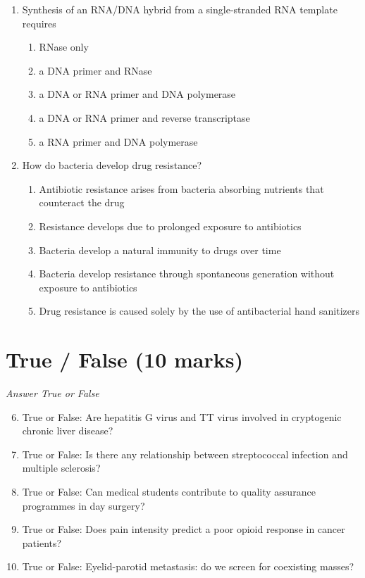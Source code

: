 \documentclass[12pt]{article}
\begin{document}
\begin{enumerate}[label=\arabic*.]
\begin{enumerate}[label=(\alph*)]
\end{enumerate}
\item Synthesis of an RNA/DNA hybrid from a single-stranded RNA template requires
\begin{enumerate}[label=(\alph*)]
    \item RNase only
    \item a DNA primer and RNase
    \item a DNA or RNA primer and DNA polymerase
    \item a DNA or RNA primer and reverse transcriptase
    \item a RNA primer and DNA polymerase
\end{enumerate}
\item How do bacteria develop drug resistance?
\begin{enumerate}[label=(\alph*)]
    \item Antibiotic resistance arises from bacteria absorbing nutrients that counteract the drug
    \item Resistance develops due to prolonged exposure to antibiotics
    \item Bacteria develop a natural immunity to drugs over time
    \item Bacteria develop resistance through spontaneous generation without exposure to antibiotics
    \item Drug resistance is caused solely by the use of antibacterial hand sanitizers
\end{enumerate}
\end{enumerate}

\section*{True / False (10 marks)}
\textit{Answer True or False}
\begin{enumerate}[label=\arabic*.]
\setcounter{enumi}{5}
\item True or False: Are hepatitis G virus and TT virus involved in cryptogenic chronic liver disease?
\item True or False: Is there any relationship between streptococcal infection and multiple sclerosis?
\item True or False: Can medical students contribute to quality assurance programmes in day surgery?
\item True or False: Does pain intensity predict a poor opioid response in cancer patients?
\item True or False: Eyelid-parotid metastasis: do we screen for coexisting masses?
\end{enumerate}
\end{document}

